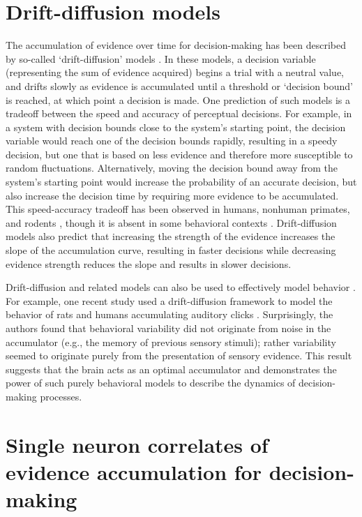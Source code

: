\section{Drift-diffusion models} \label{intro:drift_diffusion}

The accumulation of evidence over time for decision-making has been described by so-called ‘drift-diffusion’ models \citep{Ratcliff:2004ch, Smith:2000ct}. In these models, a decision variable (representing the sum of evidence acquired) begins a trial with a neutral value, and drifts slowly as evidence is accumulated until a threshold or ‘decision bound’ is reached, at which point a decision is made. One prediction of such models is a tradeoff between the speed and accuracy of perceptual decisions. For example, in a system with decision bounds close to the system’s starting point, the decision variable would reach one of the decision bounds rapidly, resulting in a speedy decision, but one that is based on less evidence and therefore more susceptible to random fluctuations. Alternatively, moving the decision bound away from the system’s starting point would increase the probability of an accurate decision, but also increase the decision time by requiring more evidence to be accumulated. This speed-accuracy tradeoff has been observed in humans, nonhuman primates, and rodents \citep{Rinberg:2006cx, Roitman:2002wr, Wickelgren:1977tg}, though it is absent in some behavioral contexts \citep{Uchida:2003kc}. Drift-diffusion models also predict that increasing the strength of the evidence increases the slope of the accumulation curve, resulting in faster decisions while decreasing evidence strength reduces the slope and results in slower decisions. 

\bigskip
Drift-diffusion and related models can also be used to effectively model behavior  \citep{Brunton:2013kg, Kira:2015cl, Drugowitsch:2012ep, Shadlen:2013jp}. For example, one recent study used a drift-diffusion framework to model the behavior of rats and humans accumulating auditory clicks \citep{Brunton:2013kg}. Surprisingly, the authors found that behavioral variability did not originate from noise in the accumulator (e.g., the memory of previous sensory stimuli); rather variability seemed to originate purely from the presentation of sensory evidence. This result suggests that the brain acts as an optimal accumulator and demonstrates the power of such purely behavioral models to describe the dynamics of decision-making processes. 

\section{Single neuron correlates of evidence accumulation for decision-making} \label{intro:single_neuron_correlate}

